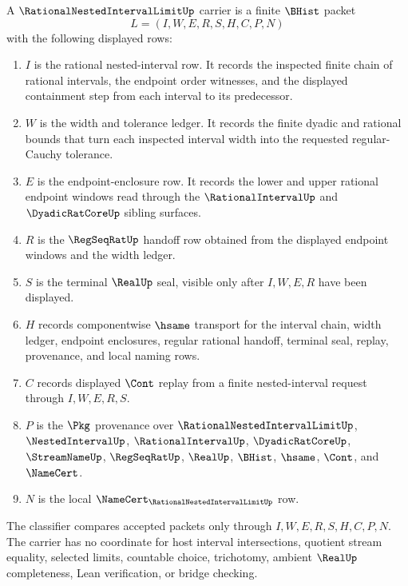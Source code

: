 \begin{definition}
\label{def:rational-nested-interval-limit-carrier}
A $\RationalNestedIntervalLimitUp$ carrier is a finite $\BHist$ packet
$$
L=(I,W,E,R,S,H,C,P,N)
$$
with the following displayed rows:
\begin{enumerate}
\item $I$ is the rational nested-interval row. It records the inspected finite chain of rational intervals, the endpoint order witnesses, and the displayed containment step from each interval to its predecessor.
\item $W$ is the width and tolerance ledger. It records the finite dyadic and rational bounds that turn each inspected interval width into the requested regular-Cauchy tolerance.
\item $E$ is the endpoint-enclosure row. It records the lower and upper rational endpoint windows read through the $\RationalIntervalUp$ and $\DyadicRatCoreUp$ sibling surfaces.
\item $R$ is the $\RegSeqRatUp$ handoff row obtained from the displayed endpoint windows and the width ledger.
\item $S$ is the terminal $\RealUp$ seal, visible only after $I,W,E,R$ have been displayed.
\item $H$ records componentwise $\hsame$ transport for the interval chain, width ledger, endpoint enclosures, regular rational handoff, terminal seal, replay, provenance, and local naming rows.
\item $C$ records displayed $\Cont$ replay from a finite nested-interval request through $I,W,E,R,S$.
\item $P$ is the $\Pkg$ provenance over $\RationalNestedIntervalLimitUp$, $\NestedIntervalUp$, $\RationalIntervalUp$, $\DyadicRatCoreUp$, $\StreamNameUp$, $\RegSeqRatUp$, $\RealUp$, $\BHist$, $\hsame$, $\Cont$, and $\NameCert$.
\item $N$ is the local $\NameCert_{\RationalNestedIntervalLimitUp}$ row.
\end{enumerate}
The classifier compares accepted packets only through $I,W,E,R,S,H,C,P,N$. The carrier has no coordinate for host interval intersections, quotient stream equality, selected limits, countable choice, trichotomy, ambient $\RealUp$ completeness, Lean verification, or bridge checking.
\end{definition}

